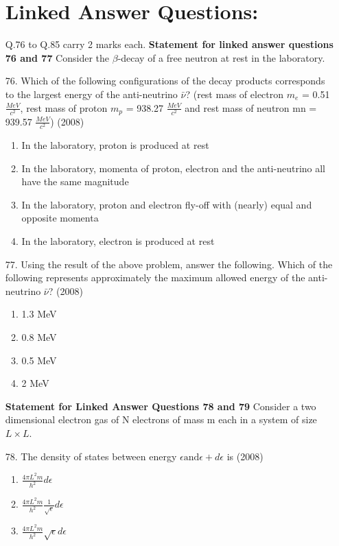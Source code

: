 \documentclass[journal]{IEEEtran}
\begin{document}
\begin{enumerate}
    \section{Linked Answer Questions:} Q.76 to Q.85 carry 2 marks each.
    \textbf{Statement for linked answer questions 76 and 77}
    Consider the $\beta$-decay of a free neutron at rest in the laboratory.
    \item[76.] Which of the following configurations of the decay products corresponds to the largest energy of the anti-neutrino $\bar{\nu}$? (rest mass of electron $m_e$ = 0.51 $\frac{MeV}{c^2}$, rest mass of proton $m_p$ = 938.27 $\frac{MeV}{c^2}$ and rest mass of neutron mn = 939.57 $\frac{MeV}{c^2}$) \hfill (2008)
      \begin{enumerate}[label=(\Alph*)]
        \item In the laboratory, proton is produced at rest
        \item In the laboratory, momenta of proton, electron and the anti-neutrino all have the same magnitude
        \item In the laboratory, proton and electron fly-off with (nearly) equal and opposite momenta
        \item In the laboratory, electron is produced at rest
      \end{enumerate}
    \item[77.] Using the result of the above problem, answer the following. Which of the following represents approximately the maximum allowed energy of the anti-neutrino $\bar{\nu}$? \hfill (2008)
    \begin{enumerate}[label=(\Alph*)]
        \item 1.3 MeV
        \item 0.8 MeV
        \item 0.5 MeV
        \item 2 MeV
    \end{enumerate}
    \textbf{Statement for Linked Answer Questions 78 and 79 }
    Consider a two dimensional electron gas of N electrons of mass m each in a system of size $L\times L$.
    \item[78.] The density of states between energy $\epsilon \text{and} \epsilon+d\epsilon$ is  \hfill (2008)
    \begin{enumerate}[label=(\Alph*)]
        \item $\frac{4\pi L^2 m}{h^2}d\epsilon$
        \item  $\frac{4\pi L^2 m}{h^2}\frac{1}{\sqrt{\epsilon}} d\epsilon$
        \item  $\frac{4\pi L^2 m}{h^2}\sqrt{\epsilon}d\epsilon$

\end{enumerate}
\end{enumerate}
\end{document}
